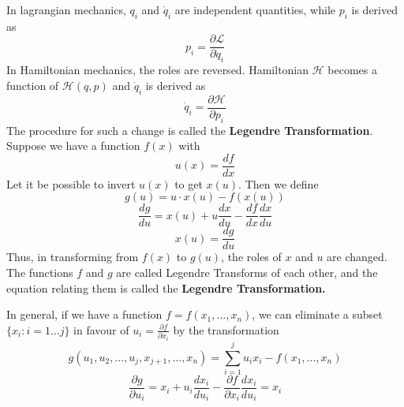 \documentclass[12pt,a4paper]{report}
\newcommand{\der}[2]{\frac{d#1}{d#2}}
\newcommand{\parder}[2]{\frac{\partial#1}{\partial#2}}
\newcommand{\lagrangian}{\mathcal{L}}
\newcommand{\hamiltonian}{\mathcal{H}}
\begin{document}
In lagrangian mechanics, $q_i$ and $\dot{q}_i$ are independent quantities, while $p_i$ is derived as
\begin{equation*}
    p_i = \parder{\lagrangian}{\dot{q}_i}
\end{equation*}
In Hamiltonian mechanics, the roles are reversed. Hamiltonian $\hamiltonian$ becomes a function of $\hamiltonian(q, p)$ and $\dot{q}_i$ is derived as
\begin{equation*}
    \dot{q}_i = \parder{\hamiltonian}{p_i}
\end{equation*}
The procedure for such a change is called the \textbf{Legendre Transformation}. Suppose we have a function $f(x)$ with
\begin{equation*}
    u(x) = \der{f}{x}
\end{equation*}
Let it be possible to invert $u(x)$ to get $x(u)$. Then we define
\begin{equation*}
    g(u) = u\cdot x(u) - f(x(u))
\end{equation*}
\begin{equation*}
    \der{g}{u} = x(u) + u \der{x}{u} - \der{f}{x} \der{x}{u}
\end{equation*}
\begin{equation*}
    x(u) = \der{g}{u}
\end{equation*}
Thus, in transforming from $f(x)$ to $g(u)$, the roles of $x$ and $u$ are changed. The functions $f$ and $g$ are called Legendre Transforms of each other, and the equation relating them is called the \textbf{Legendre Transformation.}

In general, if we have a function $f = f(x_1, \dots, x_n)$, we can eliminate a subset $\{x_i : i=1\dots j\}$ in favour of $u_i = \parder{f}{x_i}$ by the transformation
\begin{equation*}
    g(u_1, u_2, \dots, u_j, x_{j+1}, \dots, x_n) = \sum_{i=1}^{j} u_ix_i - f(x_1, \dots, x_n)
\end{equation*}
\begin{equation*}
    \parder{g}{u_i} = x_i + u_i \der{x_i}{u_i} - \parder{f}{x_i}\der{x_i}{u_i} = x_i
\end{equation*}
\end{document}
